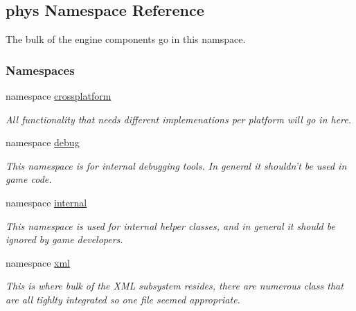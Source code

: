 \hypertarget{namespacephys}{
\subsection{phys Namespace Reference}
\label{df/dec/namespacephys}
}


The bulk of the engine components go in this namspace.  


\subsubsection*{Namespaces}
\begin{DoxyCompactItemize}
\item 
namespace \hyperlink{namespacephys_1_1crossplatform}{crossplatform}


\begin{DoxyCompactList}\small\item\em All functionality that needs different implemenations per platform will go in here. \item\end{DoxyCompactList}

\item 
namespace \hyperlink{namespacephys_1_1debug}{debug}


\begin{DoxyCompactList}\small\item\em This namespace is for internal debugging tools. In general it shouldn't be used in game code. \item\end{DoxyCompactList}

\item 
namespace \hyperlink{namespacephys_1_1internal}{internal}


\begin{DoxyCompactList}\small\item\em This namespace is used for internal helper classes, and in general it should be ignored by game developers. \item\end{DoxyCompactList}

\item 
namespace \hyperlink{namespacephys_1_1xml}{xml}


\begin{DoxyCompactList}\small\item\em This is where bulk of the XML subsystem resides, there are numerous class that are all tighlty integrated so one file seemed appropriate. \item\end{DoxyCompactList}

\end{DoxyCompactItemize}

